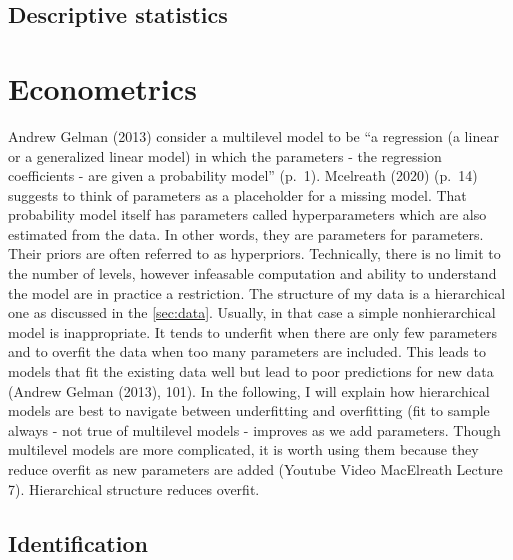 \documentclass[a4, 12pt]{article}
\begin{document}
\hypertarget{descriptive-statistics}{%
\subsection{Descriptive statistics}\label{descriptive-statistics}}

\label{descriptives}

\clearpage

\hypertarget{econometrics}{%
\section{Econometrics}\label{econometrics}}

\label{sec:econometrics}
Andrew Gelman (2013) consider a multilevel model to be ``a regression (a linear or a generalized linear model) in which the parameters - the regression coefficients - are given a probability model'' (p.~1). Mcelreath (2020) (p.~14) suggests to think of parameters as a placeholder for a missing model. That probability model itself has parameters called hyperparameters which are also estimated from the data. In other words, they are parameters for parameters. Their priors are often referred to as hyperpriors. Technically, there is no limit to the number of levels, however infeasable computation and ability to understand the model are in practice a restriction. The structure of my data is a hierarchical one as discussed in the \ref{sec:data}. Usually, in that case a simple nonhierarchical model is inappropriate. It tends to underfit when there are only few parameters and to overfit the data when too many parameters are included. This leads to models that fit the existing data well but lead to poor predictions for new data (Andrew Gelman (2013), 101). In the following, I will explain how hierarchical models are best to navigate between underfitting and overfitting (fit to sample always - not true of multilevel models - improves as we add parameters. Though multilevel models are more complicated, it is worth using them because they reduce overfit as new parameters are added (Youtube Video MacElreath Lecture 7). Hierarchical structure reduces overfit.

\hypertarget{identification}{%
\subsection{Identification}\label{identification}}
\end{document}
